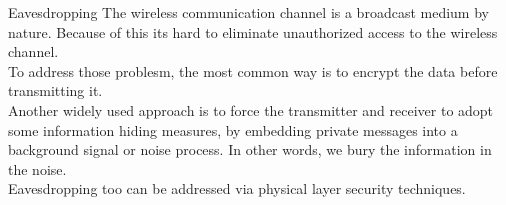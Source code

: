     \begin{section}{Eavesdropping}
      The wireless communication channel is a broadcast medium by nature. Because of this its 
      hard to eliminate unauthorized access to the wireless channel.\\
      To address those problesm, the most common way is to encrypt the data before transmitting it.\\
      Another widely used approach is to force the transmitter and receiver to adopt some 
      information hiding measures, by embedding private messages into a background signal or 
      noise process. In other words, we bury the information in the noise.\\
      Eavesdropping too can be addressed via physical layer security techniques.
\end{section}

